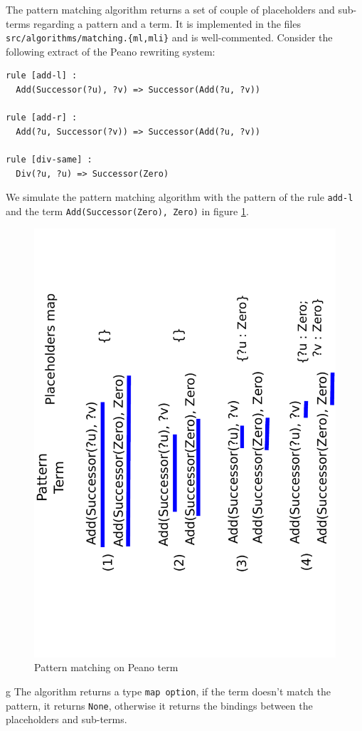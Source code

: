 \documentclass[12pt,a4paper]{article}
\begin{document}
The pattern matching algorithm returns a set of couple of placeholders and sub-terms regarding a pattern and a term. It is implemented in the files \texttt{src/algorithms/matching.\{ml,mli\}} and is well-commented. Consider the following extract of the Peano rewriting system:
\begin{lstlisting}
rule [add-l] :
  Add(Successor(?u), ?v) => Successor(Add(?u, ?v))

rule [add-r] :
  Add(?u, Successor(?v)) => Successor(Add(?u, ?v))

rule [div-same] :
  Div(?u, ?u) => Successor(Zero)
\end{lstlisting}

We simulate the pattern matching algorithm with the pattern of the rule \texttt{add-l} and the term \texttt{Add(Successor(Zero), Zero)} in figure \ref{peano-example}.

\begin{figure}
  \centering
  \includegraphics[scale=0.6, angle=270]{example-peano.pdf}
  \caption{Pattern matching on Peano term}
  \label{peano-example}
\end{figure}
g
The algorithm returns a type \texttt{map option}, if the term doesn't match the pattern, it returns \texttt{None}, otherwise it returns the bindings between the placeholders and sub-terms.
\newline
\end{document}
